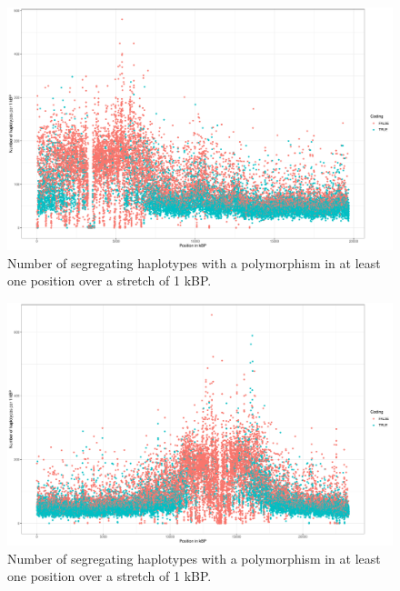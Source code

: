 \begin{figure}[th]
\centering
\includegraphics[height=.55\textheight, width=1.1\textwidth]{Figures/chr2_hap}
\decoRule
\caption[Haplotype strutcture of chromosome 2 of \textit{A. thaliana}]{Number of segregating haplotypes with a polymorphism in at least one position over a stretch of 1 kBP. }
\label{fig:time_marker}
\end{figure}


\begin{figure}[th]
\centering
\includegraphics[height=.55\textheight, width=1.1\textwidth]{Figures/chr3_hap}
\decoRule
\caption[Haplotype strutcture of chromosome 3 of \textit{A. thaliana}]{Number of segregating haplotypes with a polymorphism in at least one position over a stretch of 1 kBP. }
\label{fig:time_marker}
\end{figure}


